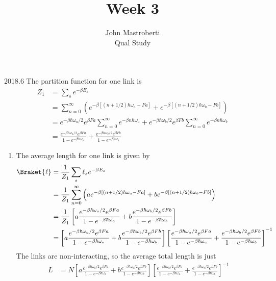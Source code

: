 \documentclass[12pt]{article}
\begin{document}
\title{Week 3}
\author{John Mastroberti\\
Qual Study}

\maketitle

\begin{solution}{2018.6}
The partition function for one link is
\begin{align*}
Z_1 & = \sum_s e^{-\beta E_s} \\
& = \sum_{n=0}^\infty \left( e^{-\beta [(n + 1/2) \hbar \omega_a - Fa]} 
+ e^{-\beta [(n + 1/2) \hbar \omega_b - Fb]} \right) \\
& = e^{-\beta \hbar \omega_a / 2} e^{\beta Fa} \sum_{n=0}^\infty e^{-\beta n \hbar \omega_a} 
+ e^{-\beta \hbar \omega_b / 2} e^{\beta Fb} \sum_{n=0}^\infty e^{-\beta n \hbar \omega_b} \\
& = \frac{e^{-\beta \hbar \omega_a / 2} e^{\beta Fa}}{1 - e^{-\beta \hbar \omega_a}}
+ \frac{e^{-\beta \hbar \omega_b / 2} e^{\beta Fb}}{1 - e^{-\beta \hbar \omega_b}}
\end{align*}
\begin{enumerate}
\item
The average length for one link is given by
\begin{align*}
\Braket{\ell} & = \frac{1}{Z_1} \sum_s \ell_s e^{-\beta E_s} \\
& = \frac{1}{Z_1} \sum_{n=0}^\infty \left( a e^{-\beta [(n + 1/2) \hbar \omega_a - Fa]} 
+ b e^{-\beta [(n + 1/2) \hbar \omega_b - Fb]} \right) \\
& = \frac{1}{Z_1} \left[
  a \frac{e^{-\beta \hbar \omega_a / 2} e^{\beta Fa}}{1 - e^{-\beta \hbar \omega_a}}
+ b \frac{e^{-\beta \hbar \omega_b / 2} e^{\beta Fb}}{1 - e^{-\beta \hbar \omega_b}} \right] \\
& = \left[
  a \frac{e^{-\beta \hbar \omega_a / 2} e^{\beta Fa}}{1 - e^{-\beta \hbar \omega_a}}
+ b \frac{e^{-\beta \hbar \omega_b / 2} e^{\beta Fb}}{1 - e^{-\beta \hbar \omega_b}} \right] \left[
  \frac{e^{-\beta \hbar \omega_a / 2} e^{\beta Fa}}{1 - e^{-\beta \hbar \omega_a}}
+ \frac{e^{-\beta \hbar \omega_b / 2} e^{\beta Fb}}{1 - e^{-\beta \hbar \omega_b}} \right]^{-1}
\end{align*}
The links are non-interacting, so the average total length is just
\begin{align*}
L & = N \left[
  a \frac{e^{-\beta \hbar \omega_a / 2} e^{\beta Fa}}{1 - e^{-\beta \hbar \omega_a}}
+ b \frac{e^{-\beta \hbar \omega_b / 2} e^{\beta Fb}}{1 - e^{-\beta \hbar \omega_b}} \right] \left[
  \frac{e^{-\beta \hbar \omega_a / 2} e^{\beta Fa}}{1 - e^{-\beta \hbar \omega_a}}
+ \frac{e^{-\beta \hbar \omega_b / 2} e^{\beta Fb}}{1 - e^{-\beta \hbar \omega_b}} \right]^{-1}
\end{align*}


\end{enumerate}
\end{solution}
\end{document}
